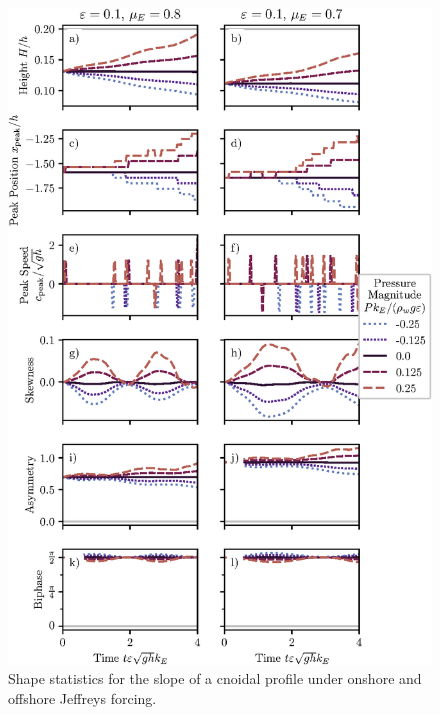\documentclass{jfm}
\begin{document}
\begin{figure}
  \centering
  \includegraphics{Slope-Skew-Asymm-Cnoidal.eps}
  \caption{
    Shape statistics for the slope of a cnoidal profile under onshore
    and offshore Jeffreys forcing.
  }
\end{figure}
\end{document}
